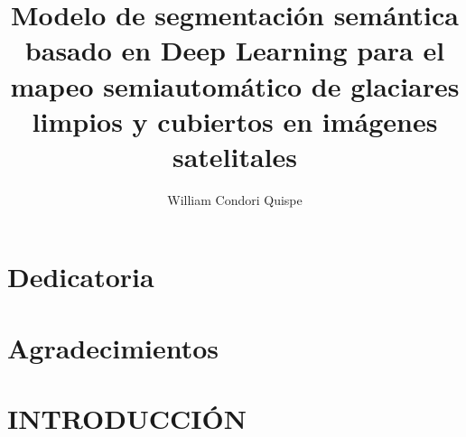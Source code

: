\documentclass[12pt]{report}
\title{Modelo de segmentación semántica basado en Deep Learning para el mapeo semiautomático de glaciares limpios y cubiertos en imágenes satelitales}
\author{William Condori Quispe}
\begin{document}
\renewcommand{\BOthers}[1]{et al.\hbox{}}




\chapter*{Dedicatoria}
\thispagestyle{fancy} %

\begin{paracol}{2}
\switchcolumn
\begin{flushright}

\end{flushright}
\end{paracol}

\chapter*{Agradecimientos}
\thispagestyle{fancy} %

\tableofcontents
\thispagestyle{fancy} %

\listoftables

\listoffigures

\chapter{INTRODUCCIÓN}
\thispagestyle{fancy} %

\setcounter{page}{1} %
















\end{document}
